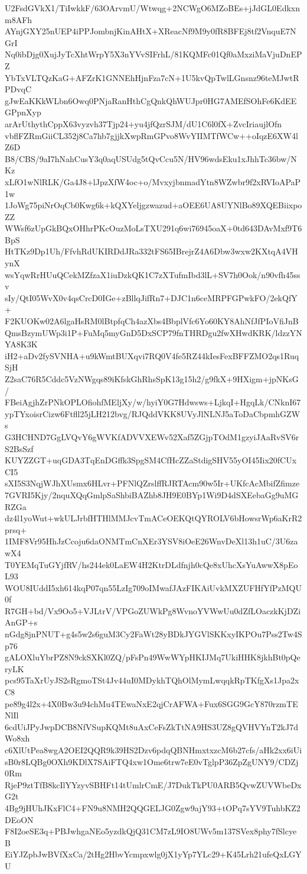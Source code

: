U2FsdGVkX1/TiIwkkF/63OArvmU/Wtwqg+2NCWgO6MZoBEs+jJdGL0Edkxnm8AFh
AYnjGXY25nUEP4iPPJombnjKinAHtX+XReacNf9M9y0fR8BFEj8tf2VnquE7NGrI
Nq0ibDjg0XujJyTcXhtWrpY5X3nYVvSIFrhL/81KQMFc01Qf0aMxziMaVjuDnEPZ
YbTxVLTQzKaG+AFZrK1GNNEhHjnFza7cN+1U5kvQpTwlLGnsnz96teMJwtRPDvqC
gJwEaKKkWLbn6Owq0PNjaRanHthCgQnkQhWUJpr0HG7AMEfSOhFe6KdEEGPpnXyp
arArUthythCppX63vyzvh37Tjp24+yu4jfQzrSJM/dU1C6l0fX+ZvcIriaujlOfn
vbflFZRmGiiCL352j8Ca7hb7gjjkXwpRmGPvo8WvYIIMTfWCw++oIqzE6XW4lZ6D
B8/CBS/9aI7hNahCusY3q0aqUSUdg5tQvCcu5N/HV96wdsEku1xJhhTc36bw/NKz
xLfO1wNlRLK/Ga4J8+lJpzXfW4oc+o/MvxyjbnmadYtn8WZwbr9f2xRVIoAPaP1w
1JoWg75piNrOqCb0Kwg6k+kQXYeljgzwazud+aOEE6UA8UYNlBo89XQEBiixpoZZ
WWsf6zUpGkBQxOHhrPKcOuzMoLsTXU291q6wi76945oaX+0td643DAvMxf9T6BpS
HtTKz9Dp1Uh/FfvhRdUKIRDdJRa332tFS65IBrejrZ4A6Dbw3wxw2KXtqA4VHynX
wsYqwRrHUuQCekMZfzaX1iuDzkQK1C7zXTufmIbd3lL+SV7h0Ook/n90vfh45ssv
sIy/QtI05WvX0v4qsCrcD0IGe+zBllqJifRn7+DJC1n6ceMRPFGPwkFO/2ekQfY+
F2KUOKw02A6lgaHsRM0lBtpfqCh4azXbs4BbplVfc6Yo60KY8AhNfJfPIoVfiJnB
QmsBzymUWp3i1P+FuMq5myGnD5DxSCP79fnTHRDgu2fwXHwdKRK/ldzzYNYA8K3K
iH2+aDv2fySVNHA+u9kWmtBUXqvi7RQ0V4fe5RZ44kIesFexBFFZMO2qs1RuqSjH
Z2saC76R5Cddc5VzNWgqs89iKfskGhRhsSpK13g15h2/g9fkX+9HXigm+jpNKsG/
FBeiAgjhZrPNkOPLOfiohfMEljXy/w/hyiY0G7Hdwsws+LjkqI+HgqLk/CNknI67
ypTYxoisrCizw6Ftfll25jLH212bvg/RJQddVKK8UVyJlNLNJ5aToDaCbpmhGZWs
G3HCHND7GgLVQvY6gWVKfADVVXEWv52Xaf5ZGjpTOdM1gzyiJAaRvSV6rS2BsSzf
KUYZZGT+uqGDA3TqEnDGffk3SpgSM4CfHcZZaStdigSHV55yOI45Iix20fCUxCI5
sXI5S3NqjWJhXUsmx6HLvr+PFNlQZrslffRJRTAcm90w5Ir+UKfcAcMbifZfimze
7GVRI5Kjy/2nquXQqGmlpSaShbiBAZhb8JH9E0BYp1Wi9D4dSXEebaGg9uMGRZGa
dz4l1yoWut+wkULJrbfHTHlMMJcvTmACeOEKQtQYROLV6bHowsrWp6aKrR2prsq+
1IMF8Vr95HhJzCcoju6daONMTmCnXEr3YSV8iOeE26WnvDeXl13h1uC/3U6zawX4
T0YEMqTuGYjfRV/hs244ek0LaEW4H2KtrDLdfnjh0cQe8xUhcXsYuAwwX8pEoL93
WOU8IUddI5xh614kqP07qn55LzIg709oIMwafJAzFIKAiUvkMXZUFHfYfPzMQU0f
R7GH+bd/Vx9Oo5+VJLtrV/VPGoZUWkPg8WvnoYVWwUu0dZfLOaczkKjDZiAnGP+s
nGdg8jnPNUT+g4s5w2s6guM3Cy2FaWt28yBDkJYGVlSKKxyIKPOu7Pss2Tw4Sp76
gALOXluYbrPZ8N9ckSXKl0ZQ/pFsPn49WwWYpHKIJMq7UkiHHK8jkhBt0pQeryLK
pcs95TaXrUyJS2sRgmoTSt4Jv44uI0MDykhTQhOlMymLwqqkRpTKfgXs1Jpa2xC8
pe89g4l2x+4X0Bw3u94chMu4TEwaNxE2qjCrAFWA+Fux6SGG9GcY870rzmTENlIl
6cdUiJPyJwpDCB8NfVSupKQMt8uAxCeFsZkTtNA9HS3UZ8gQVHVYnT2kJ7dWo8xh
c6XlUtPea8wgA2OEI2QQR9k39HS2Dzv6pdqQBNHmxtxzcM6b27cfs/aHk2xx6iUi
sB0r8LQBg0OXh9KDlX7SAiFTQ4xw1Ome6trw7eE0vTglpP36ZpZgUNY9/CDZj0Rm
RjeP9ztTfB8kcIlYYzyvSBHFt14tUmlrCmE/J7DukTkPU0ARB5QvwZUVWbeDxG2t
4Bg9jHUhJKxFlC4+FN9u8NMH2QQGELJG0Zgw9ajY93+tOPq7sYV9TuhbKZ2DEoON
F8I2oeSE3q+PBJwhgaNEo5yzdkQjQ31CM7zL9IO8UWv5m137SVex8phy7fSlcyeB
EiYJZpbJwBVfXxCa/2tHg2HbvYcmpxwlg0jX1yYp7YLc29+K45Lrh21ufeQxLGYU
